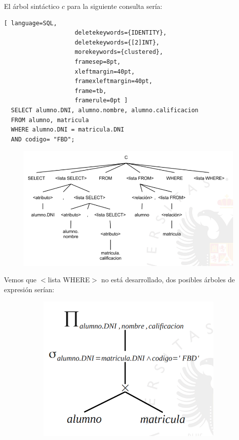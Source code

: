\begin{example}
\begin{example}
El árbol sintáctico $c$ para la siguiente consulta sería:
\begin{lstlisting}[ language=SQL,
                    deletekeywords={IDENTITY},
                    deletekeywords={[2]INT},
                    morekeywords={clustered},
                    framesep=8pt,
                    xleftmargin=40pt,
                    framexleftmargin=40pt,
                    frame=tb,
                    framerule=0pt ]
  SELECT alumno.DNI, alumno.nombre, alumno.calificacion 
  FROM alumno, matricula 
  WHERE alumno.DNI = matricula.DNI 
  AND codigo= "FBD";
\end{lstlisting}
\begin{figure}[H]
  \center
  \includegraphics[scale=0.4]{img/2.png}
\end{figure}
Vemos que $<$lista WHERE$>$ no está desarrollado, dos posibles árboles de expresión serían:
\begin{figure}[H]
\centering
\begin{subfigure}{.5\textwidth}
  \centering
  \includegraphics[scale=0.4]{img/3.png}

\end{subfigure}
\end{figure}
\end{example}
\end{example}
